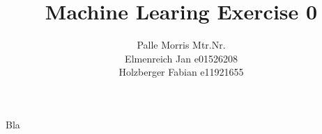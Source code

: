 \documentclass[11pt]{article}
\begin{document}
\author{Palle Morris Mtr.Nr.\\ Elmenreich Jan e01526208\\ Holzberger Fabian e11921655 }
\title{Machine Learing Exercise 0}
\maketitle

\medskip

Bla
\end{document}
